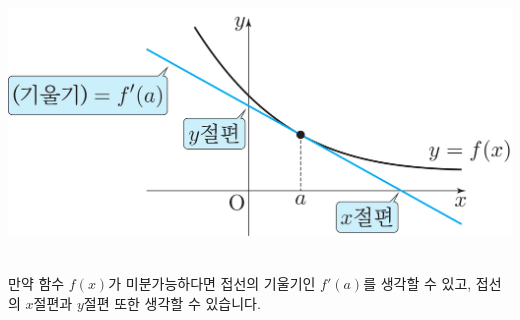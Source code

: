 \begin{center} \includegraphics[scale=\pgfkeysvalueof{picsize}]{DBs/pic/zery_17.pdf}\
	\end{center}만약 함수 $f\left( x \right) $가 미분가능하다면 접선의 기울기인 $f'\left( a \right) $를 생각할 수 있고, 접선의 $x$절편과 $y$절편 또한 생각할 수 있습니다.




